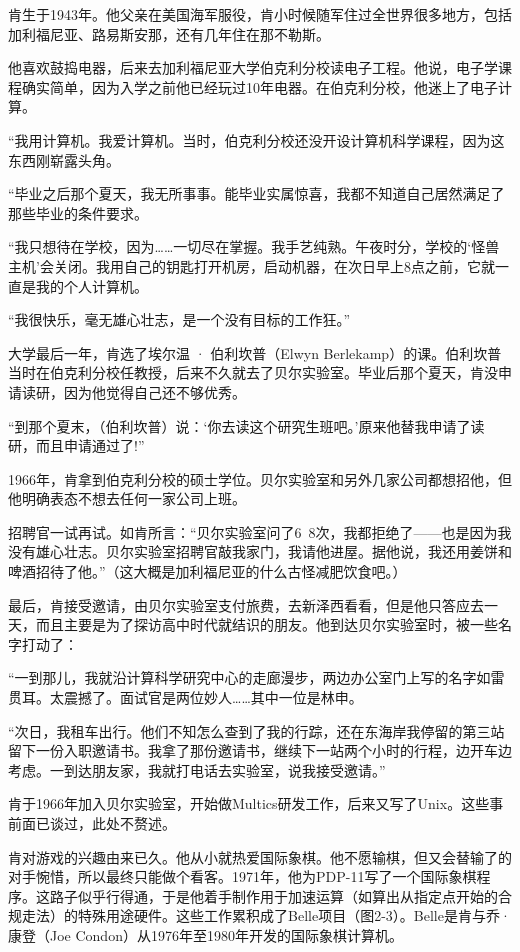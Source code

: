 \documentclass[a4paper,12pt,UTF8,twoside]{ctexbook}
\begin{document}
{肯生于1943年。他父亲在美国海军服役，肯小时候随军住过全世界很多地方，包括加利福尼亚、路易斯安那，还有几年住在那不勒斯。

他喜欢鼓捣电器，后来去加利福尼亚大学伯克利分校读电子工程。他说，电子学课程确实简单，因为入学之前他已经玩过10年电器。在伯克利分校，他迷上了电子计算。

“我用计算机。我爱计算机。当时，伯克利分校还没开设计算机科学课程，因为这东西刚崭露头角。

“毕业之后那个夏天，我无所事事。能毕业实属惊喜，我都不知道自己居然满足了那些毕业的条件要求。

“我只想待在学校，因为……一切尽在掌握。我手艺纯熟。午夜时分，学校的‘怪兽主机’会关闭。我用自己的钥匙打开机房，启动机器，在次日早上8点之前，它就一直是我的个人计算机。

“我很快乐，毫无雄心壮志，是一个没有目标的工作狂。”



大学最后一年，肯选了埃尔温 · 伯利坎普（Elwyn Berlekamp）的课。伯利坎普当时在伯克利分校任教授，后来不久就去了贝尔实验室。毕业后那个夏天，肯没申请读研，因为他觉得自己还不够优秀。

“到那个夏末，（伯利坎普）说：‘你去读这个研究生班吧。’原来他替我申请了读研，而且申请通过了!”



1966年，肯拿到伯克利分校的硕士学位。贝尔实验室和另外几家公司都想招他，但他明确表态不想去任何一家公司上班。

招聘官一试再试。如肯所言：“贝尔实验室问了6~8次，我都拒绝了——也是因为我没有雄心壮志。贝尔实验室招聘官敲我家门，我请他进屋。据他说，我还用姜饼和啤酒招待了他。”（这大概是加利福尼亚的什么古怪减肥饮食吧。）

最后，肯接受邀请，由贝尔实验室支付旅费，去新泽西看看，但是他只答应去一天，而且主要是为了探访高中时代就结识的朋友。他到达贝尔实验室时，被一些名字打动了：

“一到那儿，我就沿计算科学研究中心的走廊漫步，两边办公室门上写的名字如雷贯耳。太震撼了。面试官是两位妙人……其中一位是林申。

“次日，我租车出行。他们不知怎么查到了我的行踪，还在东海岸我停留的第三站留下一份入职邀请书。我拿了那份邀请书，继续下一站两个小时的行程，边开车边考虑。一到达朋友家，我就打电话去实验室，说我接受邀请。”



肯于1966年加入贝尔实验室，开始做Multics研发工作，后来又写了Unix。这些事前面已谈过，此处不赘述。

肯对游戏的兴趣由来已久。他从小就热爱国际象棋。他不愿输棋，但又会替输了的对手惋惜，所以最终只能做个看客。1971年，他为PDP-11写了一个国际象棋程序。这路子似乎行得通，于是他着手制作用于加速运算（如算出从指定点开始的合规走法）的特殊用途硬件。这些工作累积成了Belle项目（图2-3）。Belle是肯与乔·康登（Joe Condon）从1976年至1980年开发的国际象棋计算机。



}
\end{document}
